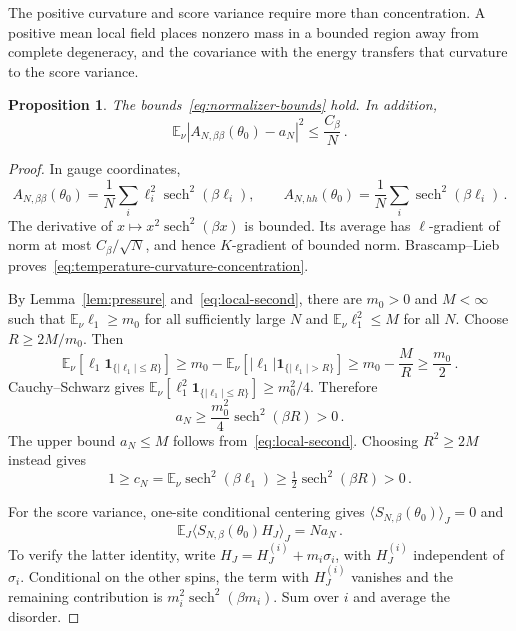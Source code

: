 \documentclass[11pt]{amsart}
\numberwithin{equation}{section}
\newtheorem{proposition}[theorem]{Proposition}
\theoremstyle{remark}
\newcommand{\E}{\mathbb E}
\newcommand{\one}{\mathbf 1}
\newcommand{\sech}{\operatorname{sech}}
\begin{document}
The positive curvature and score variance require more than concentration. A positive mean local field places nonzero mass in a bounded region away from complete degeneracy, and the covariance with the energy transfers that curvature to the score variance.

\begin{proposition}\label{prop:nondegeneracy}
The bounds~\eqref{eq:normalizer-bounds} hold. In addition,
\begin{equation}
 \E_\nu\left|A_{N,\beta\beta}(\theta_0)-a_N\right|^2
 \le\frac{C_\beta}{N}\,.
 \label{eq:temperature-curvature-concentration}
\end{equation}
\end{proposition}
\begin{proof}
In gauge coordinates,
\begin{equation*}
 A_{N,\beta\beta}(\theta_0)=\frac1N\sum_i\ell_i^2\sech^2(\beta\ell_i),
 \qquad
 A_{N,hh}(\theta_0)=\frac1N\sum_i\sech^2(\beta\ell_i)\,.
\end{equation*}
The derivative of $x\mapsto x^2\sech^2(\beta x)$ is bounded. Its average has $\ell$-gradient of norm at most $C_\beta/\sqrt N$, and hence $K$-gradient of bounded norm. Brascamp--Lieb proves~\eqref{eq:temperature-curvature-concentration}.

By Lemma~\ref{lem:pressure} and~\eqref{eq:local-second}, there are $m_0>0$ and $M<\infty$ such that $\E_\nu\ell_1\ge m_0$ for all sufficiently large $N$ and $\E_\nu\ell_1^2\le M$ for all $N$. Choose $R\ge2M/m_0$. Then
\begin{equation*}
 \E_\nu[\ell_1\one_{\{|\ell_1|\le R\}}]
 \ge m_0-\E_\nu[|\ell_1|\one_{\{|\ell_1|>R\}}]
 \ge m_0-\frac MR\ge\frac{m_0}2\,.
\end{equation*}
Cauchy--Schwarz gives $\E_\nu[\ell_1^2\one_{\{|\ell_1|\le R\}}]\ge m_0^2/4$. Therefore
\begin{equation*}
 a_N\ge\frac{m_0^2}4\sech^2(\beta R)>0\,.
\end{equation*}
The upper bound $a_N\le M$ follows from~\eqref{eq:local-second}. Choosing $R^2\ge2M$ instead gives
\begin{equation*}
 1\ge c_N=\E_\nu\sech^2(\beta\ell_1)
 \ge\tfrac12\sech^2(\beta R)>0\,.
\end{equation*}

For the score variance, one-site conditional centering gives $\langle S_{N,\beta}(\theta_0)\rangle_J=0$ and
\begin{equation}
 \E_J\langle S_{N,\beta}(\theta_0)H_J\rangle_J=Na_N\,.
 \label{eq:score-energy-covariance}
\end{equation}
To verify the latter identity, write $H_J=H_J^{(i)}+m_i\sigma_i$, with $H_J^{(i)}$ independent of $\sigma_i$. Conditional on the other spins, the term with $H_J^{(i)}$ vanishes and the remaining contribution is $m_i^2\sech^2(\beta m_i)$. Sum over $i$ and average the disorder.


\end{proof}
\end{document}

